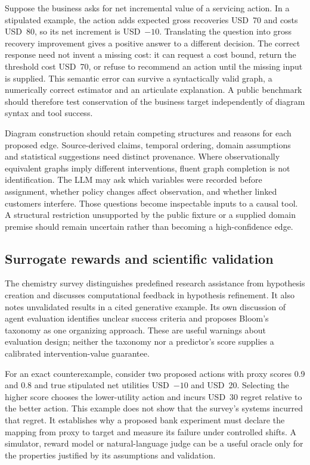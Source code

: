 Suppose the business asks for net incremental value of a servicing action. In a stipulated example, the action adds expected gross recoveries USD~70 and costs USD~80, so its net increment is USD~$-10$. Translating the question into gross recovery improvement gives a positive answer to a different decision. The correct response need not invent a missing cost: it can request a cost bound, return the threshold cost USD~70, or refuse to recommend an action until the missing input is supplied. This semantic error can survive a syntactically valid graph, a numerically correct estimator and an articulate explanation. A public benchmark should therefore test conservation of the business target independently of diagram syntax and tool success.~\citep{exec25_cow_reference}

Diagram construction should retain competing structures and reasons for each proposed edge. Source-derived claims, temporal ordering, domain assumptions and statistical suggestions need distinct provenance. Where observationally equivalent graphs imply different interventions, fluent graph completion is not identification. The LLM may ask which variables were recorded before assignment, whether policy changes affect observation, and whether linked customers interfere. Those questions become inspectable inputs to a causal tool. A structural restriction unsupported by the public fixture or a supplied domain premise should remain uncertain rather than becoming a high-confidence edge.~\citep{exec25_cow_reference}

\subsection{Surrogate rewards and scientific validation}

The chemistry survey distinguishes predefined research assistance from hypothesis creation and discusses computational feedback in hypothesis refinement. It also notes unvalidated results in a cited generative example. Its own discussion of agent evaluation identifies unclear success criteria and proposes Bloom's taxonomy as one organizing approach. These are useful warnings about evaluation design; neither the taxonomy nor a predictor's score supplies a calibrated intervention-value guarantee.~\citep{exec25_cow_chemistry}

For an exact counterexample, consider two proposed actions with proxy scores 0.9 and 0.8 and true stipulated net utilities USD~$-10$ and USD~20. Selecting the higher score chooses the lower-utility action and incurs USD~30 regret relative to the better action. This example does not show that the survey's systems incurred that regret. It establishes why a proposed bank experiment must declare the mapping from proxy to target and measure its failure under controlled shifts. A simulator, reward model or natural-language judge can be a useful oracle only for the properties justified by its assumptions and validation.~\citep{exec25_cow_reference}

